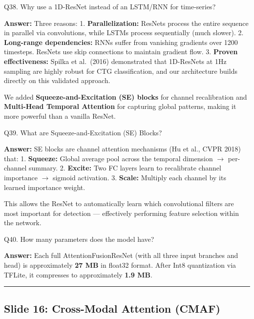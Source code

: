 \documentclass[11pt,a4paper]{article}
\begin{document}
\begin{questionbox}
Q38. Why use a 1D-ResNet instead of an LSTM/RNN for
time-series?
\end{questionbox}
\textbf{Answer:} Three reasons: 1. \textbf{Parallelization:} ResNets process
the entire sequence in parallel via convolutions, while LSTMs process
sequentially (much slower). 2. \textbf{Long-range dependencies:} RNNs
suffer from vanishing gradients over 1200 timesteps. ResNets use skip
connections to maintain gradient flow. 3. \textbf{Proven effectiveness:}
Spilka et al.~(2016) demonstrated that 1D-ResNets at 1Hz sampling are
highly robust for CTG classification, and our architecture builds
directly on this validated approach.

We added \textbf{Squeeze-and-Excitation (SE) blocks} for channel
recalibration and \textbf{Multi-Head Temporal Attention} for capturing
global patterns, making it more powerful than a vanilla ResNet.

\begin{questionbox}
Q39. What are Squeeze-and-Excitation (SE) Blocks?
\end{questionbox}
\textbf{Answer:} SE blocks are channel attention mechanisms (Hu et al., CVPR
2018) that: 1. \textbf{Squeeze:} Global average pool across the temporal
dimension $\rightarrow$ per-channel summary. 2. \textbf{Excite:} Two FC layers learn
to recalibrate channel importance $\rightarrow$ sigmoid activation. 3.
\textbf{Scale:} Multiply each channel by its learned importance weight.

This allows the ResNet to automatically learn which convolutional
filters are most important for detection --- effectively performing
feature selection within the network.

\begin{questionbox}
Q40. How many parameters does the model have?
\end{questionbox}
\textbf{Answer:} Each full AttentionFusionResNet (with all three input
branches and head) is approximately \textbf{27 MB} in float32 format.
After Int8 quantization via TFLite, it compresses to approximately
\textbf{1.9 MB}.

\begin{center}\rule{0.5\linewidth}{0.5pt}\end{center}

\subsection{Slide 16: Cross-Modal Attention
(CMAF)}\label{slide-16-cross-modal-attention-cmaf}
\end{document}
